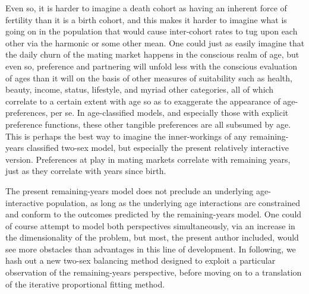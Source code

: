 Even so, it is harder to imagine a death cohort as having an inherent 
force of fertility than it is a birth cohort, and this makes it harder to 
imagine what is going on in the population that would cause inter-cohort rates 
to tug upon each other via the harmonic or some other mean. One could just as
easily imagine that the daily churn of the mating market happens in the
conscious realm of age, but even so, preference and partnering will unfold less
with the conscious evaluation of ages than it will on the basis of other
measures of suitability such as health, beauty, income, status, lifestyle, and
myriad other categories, all of which correlate to a certain extent with age so
as to exaggerate the appearance of age-preferences, per se. In age-classified
models, and especially those with explicit preference functions, these other
tangible preferences are all subsumed by age. This is perhaps the best way to
imagine the inner-workings of any remaining-years classified two-sex model, but
especially the present relatively interactive version. Preferences at play in
mating markets correlate with remaining years, just as they correlate with years
since birth.

The present remaining-years model does not preclude an
underlying age-interactive population, as long as the underlying age
interactions are constrained and conform to the outcomes predicted by the
remaining-years model. One could of course attempt to model both perspectives
simultaneously, via an increase in the dimensionality of the problem, but most,
the present author included, would see more obstacles than advantages in this
line of development. In following, we hash out a new two-sex balancing method
designed to exploit a particular observation of the remaining-years
perspective, before moving on to a translation of the iterative proportional fitting method.

\FloatBarrier